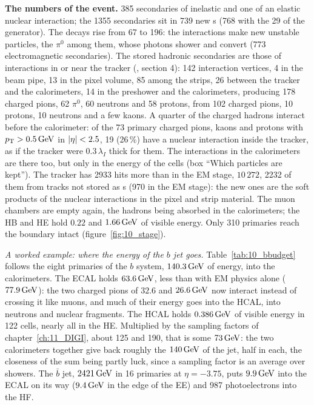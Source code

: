 \textbf{The numbers of the event.} 385 secondaries of inelastic and one of an elastic nuclear interaction; the 1355
secondaries sit in 739 new s (768 with the 29 of the generator). The decays rise from 67 to 196: the interactions make new unstable particles, the $\pi^0$ among
them, whose photons shower and convert (773 electromagnetic secondaries). The stored hadronic secondaries are those of interactions in or near
the tracker (, section 4): 142 interaction vertices, 4 in the beam pipe, 13 in the pixel
volume, 85 among the strips, 26 between the tracker and the calorimeters, 14 in the preshower and the calorimeters,
producing 178 charged pions, 62 $\pi^0$, 60 neutrons and 58 protons, from 102 charged pions,
10 protons, 10 neutrons and a few kaons. A quarter of the charged hadrons interact before the calorimeter: of the 73
primary charged pions, kaons and protons with $p_{\mathrm{T}}>0.5\,\mathrm{GeV}$ in $|\eta|<2.5$, 19 (26\,\%) have a nuclear interaction
inside the tracker, as if the tracker were $0.3\,\lambda_I$ thick for them. The interactions in the calorimeters are
there too, but only in the energy of the cells (box ``Which particles are kept''). The tracker has 2933 hits more than in the EM stage, $10\,272$, 2232 of them from tracks not stored as
s (970 in the EM stage): the new ones are the soft products of the nuclear interactions in the pixel and
strip material. The muon chambers
are empty again, the hadrons being absorbed in the calorimeters; the HB and HE hold $0.22$ and $1.66\,\mathrm{GeV}$ of visible
energy. Only 310 primaries reach the boundary intact (figure~\ref{fig:10_stage}).

\emph{A worked example: where the energy of the $b$ jet goes.} Table~\ref{tab:10_bbudget} follows the eight
primaries of the $b$ system, $140.3\,\mathrm{GeV}$ of energy, into the calorimeters. The ECAL holds $63.6\,\mathrm{GeV}$, less than with
EM physics alone ($77.9\,\mathrm{GeV}$): the two charged pions of $32.6$ and $26.6\,\mathrm{GeV}$ now interact instead of crossing it like
muons, and much of their energy goes into the HCAL, into neutrons and nuclear fragments. The HCAL holds $0.386\,\mathrm{GeV}$ of
visible energy in 122 cells, nearly all in the HE. Multiplied by the sampling factors of chapter~\ref{ch:11_DIGI},
about 125 and 190, that is some $73\,\mathrm{GeV}$: the two calorimeters together give back roughly the $140\,\mathrm{GeV}$ of the jet,
half in each, the closeness of the sum being partly luck, since a sampling factor is an average over showers. The
$\bar b$ jet, $2421\,\mathrm{GeV}$ in 16 primaries at $\eta=-3.75$, puts $9.9\,\mathrm{GeV}$ into the ECAL on its way ($9.4\,\mathrm{GeV}$ in
the edge of the EE) and 987 photoelectrons into the HF.

